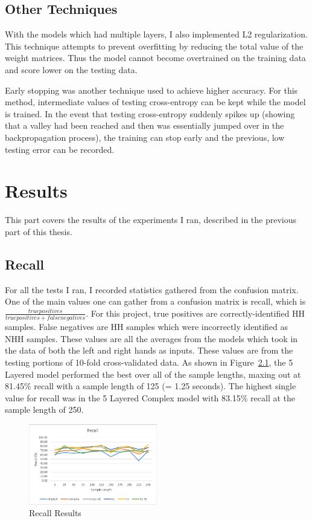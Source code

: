 \documentclass[]{report}
\begin{document}
\section{Other Techniques}

With the models which had multiple layers, I also implemented L2 regularization. This technique attempts to prevent overfitting by reducing the total value of the weight matrices. Thus the model cannot become overtrained on the training data and score lower on the testing data.

Early stopping was another technique used to achieve higher accuracy. For this method, intermediate values of testing cross-entropy can be kept while the model is trained. In the event that testing cross-entropy suddenly spikes up (showing that a valley had been reached and then was essentially jumped over in the backpropagation process), the training can stop early and the previous, low testing error can be recorded.

\chapter{Results}

This part covers the results of the experiments I ran, described in the previous part of this thesis.

\section{Recall}

For all the tests I ran, I recorded statistics gathered from the confusion matrix. One of the main values one can gather from a confusion matrix is recall, which is $\frac{truepositives}{truepositives + falsenegatives}$. For this project, true positives are correctly-identified HH samples. False negatives are HH samples which were incorrectly identified as NHH samples. These values are all the averages from the models which took in the data of both the left and right hands as inputs. These values are from the testing portions of 10-fold cross-validated data. As shown in Figure~\ref{recall}, the 5 Layered model performed the best over all of the sample lengths, maxing out at 81.45\% recall with a sample length of 125 (= 1.25 seconds). The highest single value for recall was in the 5 Layered Complex model with 83.15\% recall at the sample length of 250. 

\begin{figure}
	\centering
	\includegraphics[width=0.5\textwidth]{../images/recall2}
	\caption{Recall Results}
	\label{recall}
\end{figure}
\end{document}
